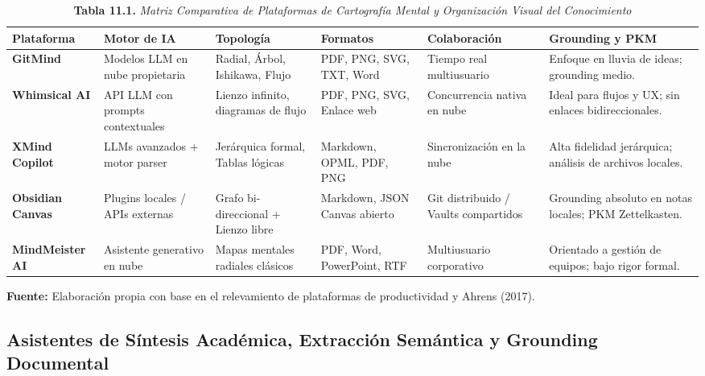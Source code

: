 \begin{table}[tbp]
\centering
\footnotesize
\begin{tcolorbox}[colback=white, colframe=unmsm_gold, arc=3pt, boxrule=0.8pt, top=0.2cm, bottom=0.2cm, left=0.3cm, right=0.3cm]
\caption*{\textbf{Tabla 11.1.} \textit{Matriz Comparativa de Plataformas de Cartografía Mental y Organización Visual del Conocimiento}}
\vspace{-0.2cm}
\begin{tabularx}{\textwidth}{>{\raggedright\arraybackslash\bfseries}p{2.0cm} >{\raggedright\arraybackslash}p{2.2cm} >{\raggedright\arraybackslash}p{2.0cm} >{\raggedright\arraybackslash}p{1.8cm} >{\raggedright\arraybackslash}p{2.2cm} >{\raggedright\arraybackslash}X}
\toprule
Plataforma & Motor de IA & Topología & Formatos & Colaboración & Grounding y PKM \\
\midrule
GitMind & Modelos LLM en nube propietaria & Radial, Árbol, Ishikawa, Flujo & PDF, PNG, SVG, TXT, Word & Tiempo real multiusuario & Enfoque en lluvia de ideas; grounding medio. \\
\addlinespace
Whimsical AI & API LLM con prompts contextuales & Lienzo infinito, diagramas de flujo & PDF, PNG, SVG, Enlace web & Concurrencia nativa en nube & Ideal para flujos y UX; sin enlaces bidireccionales. \\
\addlinespace
XMind Copilot & LLMs avanzados + motor parser & Jerárquica formal, Tablas lógicas & Markdown, OPML, PDF, PNG & Sincronización en la nube & Alta fidelidad jerárquica; análisis de archivos locales. \\
\addlinespace
Obsidian Canvas & Plugins locales / APIs externas & Grafo bi-direccional + Lienzo libre & Markdown, JSON Canvas abierto & Git distribuido / Vaults compartidos & Grounding absoluto en notas locales; PKM Zettelkasten. \\
\addlinespace
MindMeister AI & Asistente generativo en nube & Mapas mentales radiales clásicos & PDF, Word, PowerPoint, RTF & Multiusuario corporativo & Orientado a gestión de equipos; bajo rigor formal. \\
\bottomrule
\end{tabularx}
\vspace{0.25cm}
{\scriptsize \textbf{Fuente:} Elaboración propia con base en el relevamiento de plataformas de productividad y Ahrens (2017).}
\end{tcolorbox}
\end{table}

\subsection{Asistentes de Síntesis Académica, Extracción Semántica y Grounding Documental}

